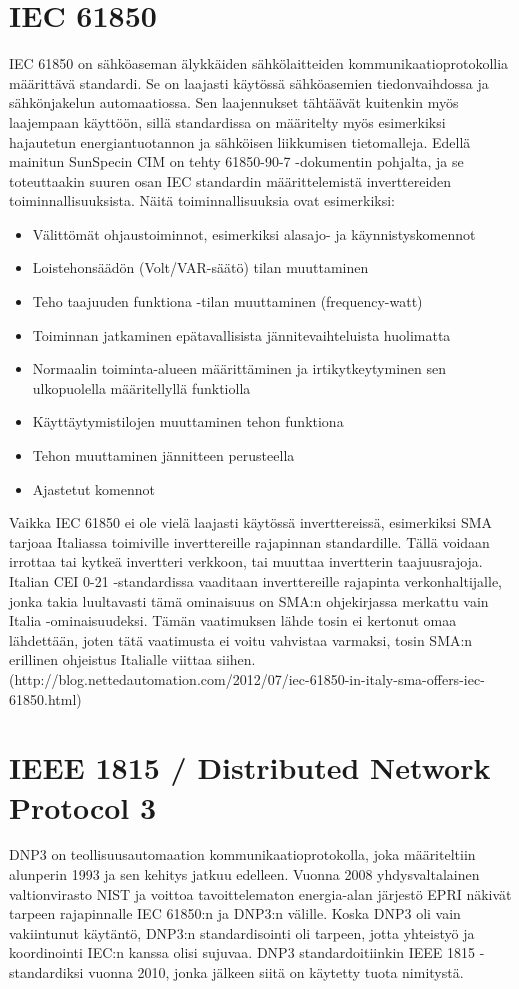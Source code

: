\section{IEC 61850}
  IEC 61850 on sähköaseman älykkäiden sähkölaitteiden kommunikaatioprotokollia määrittävä standardi. Se on laajasti käytössä sähköasemien tiedonvaihdossa ja sähkönjakelun automaatiossa. Sen laajennukset tähtäävät kuitenkin myös laajempaan käyttöön, sillä standardissa on määritelty myös esimerkiksi hajautetun energiantuotannon ja sähköisen liikkumisen tietomalleja. Edellä mainitun SunSpecin CIM on tehty 61850-90-7 -dokumentin pohjalta, ja se toteuttaakin suuren osan IEC standardin määrittelemistä inverttereiden toiminnallisuuksista. Näitä toiminnallisuuksia ovat esimerkiksi:
  \begin{itemize}
    \item Välittömät ohjaustoiminnot, esimerkiksi alasajo- ja käynnistyskomennot
    \item Loistehonsäädön (Volt/VAR-säätö) tilan muuttaminen 
    \item Teho taajuuden funktiona -tilan muuttaminen (frequency-watt)
    \item Toiminnan jatkaminen epätavallisista jännitevaihteluista huolimatta
    \item Normaalin toiminta-alueen määrittäminen ja irtikytkeytyminen sen ulkopuolella määritellyllä funktiolla
    \item Käyttäytymistilojen muuttaminen tehon funktiona
    \item Tehon muuttaminen jännitteen perusteella
    \item Ajastetut komennot
  \end{itemize}

  Vaikka IEC 61850 ei ole vielä laajasti käytössä inverttereissä, esimerkiksi SMA tarjoaa Italiassa toimiville inverttereille rajapinnan standardille. Tällä voidaan irrottaa tai kytkeä invertteri verkkoon, tai muuttaa invertterin taajuusrajoja. Italian CEI 0-21 -standardissa vaaditaan inverttereille rajapinta verkonhaltijalle, jonka takia luultavasti tämä ominaisuus on SMA:n ohjekirjassa merkattu vain Italia -ominaisuudeksi. Tämän vaatimuksen lähde tosin ei kertonut omaa lähdettään, joten tätä vaatimusta ei voitu vahvistaa varmaksi, tosin SMA:n erillinen ohjeistus Italialle viittaa siihen. (http://blog.nettedautomation.com/2012/07/iec-61850-in-italy-sma-offers-iec-61850.html)

\section{IEEE 1815 / Distributed Network Protocol 3}
  DNP3 on teollisuusautomaation kommunikaatioprotokolla, joka määriteltiin alunperin 1993 ja sen kehitys jatkuu edelleen. Vuonna 2008 yhdysvaltalainen valtionvirasto NIST ja voittoa tavoittelematon energia-alan järjestö EPRI näkivät tarpeen rajapinnalle IEC 61850:n ja DNP3:n välille. Koska DNP3 oli vain vakiintunut käytäntö, DNP3:n standardisointi oli tarpeen, jotta yhteistyö ja koordinointi IEC:n kanssa olisi sujuvaa. DNP3 standardoitiinkin IEEE 1815 -standardiksi vuonna 2010, jonka jälkeen siitä on käytetty tuota nimitystä. 
  
